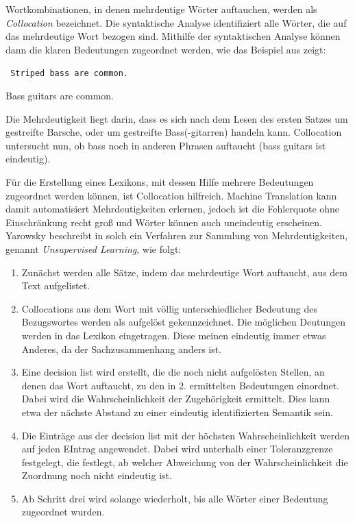 \documentclass[12pt]{report}
\begin{document}
Wortkombinationen, in denen mehrdeutige Wörter auftauchen, werden als \textit{Collocation} bezeichnet. Die syntaktische Analyse identifiziert alle Wörter, die auf das mehrdeutige Wort bezogen sind. Mithilfe der syntaktischen Analyse können dann die klaren Bedeutungen zugeordnet werden, wie das Beispiel aus \cite{cop04} zeigt:

\tt
Striped bass are common.

Bass guitars are common.
\rm

Die Mehrdeutigkeit liegt darin, dass es sich nach dem Lesen des ersten Satzes um gestreifte Barsche, oder um gestreifte Bass(-gitarren) handeln kann. Collocation untersucht nun, ob bass noch in anderen Phrasen auftaucht (bass guitars ist eindeutig).

Für die Erstellung eines Lexikons, mit dessen Hilfe mehrere Bedeutungen zugeordnet werden können, ist Collocation hilfreich. Machine Translation kann damit automatisiert Mehrdeutigkeiten erlernen, jedoch ist die Fehlerquote ohne Einschränkung recht groß und Wörter können auch uneindeutig erscheinen. Yarowsky beschreibt in \cite{yar95} solch ein Verfahren zur Sammlung von Mehrdeutigkeiten, genannt \textit{Unsupervised Learning}, wie folgt: 

\begin{enumerate}
\item Zunächst werden alle Sätze, indem das mehrdeutige Wort auftaucht, aus dem Text aufgelistet.
\item Collocations aus dem Wort mit völlig unterschiedlicher Bedeutung des Bezugswortes werden als aufgelöst gekennzeichnet. Die möglichen Deutungen werden in das Lexikon eingetragen. Diese meinen eindeutig immer etwas Anderes, da der Sachzusammenhang anders ist.
\item Eine decision list wird erstellt, die die noch nicht aufgelösten Stellen, an denen das Wort auftaucht, zu den in 2. ermittelten Bedeutungen einordnet. Dabei wird die Wahrscheinlichkeit der Zugehörigkeit ermittelt. Dies kann etwa der nächste Abstand zu einer eindeutig identifizierten Semantik sein.
\item Die Einträge aus der decision list mit der höchsten Wahrscheinlichkeit werden auf jeden EIntrag angewendet. Dabei wird unterhalb einer Toleranzgrenze festgelegt, die festlegt, ab welcher Abweichung von der Wahrscheinlichkeit die Zuordnung noch nicht eindeutig ist. 
\item Ab Schritt drei wird solange wiederholt, bis alle Wörter einer Bedeutung zugeordnet wurden.
\end{enumerate} 
\end{document}
